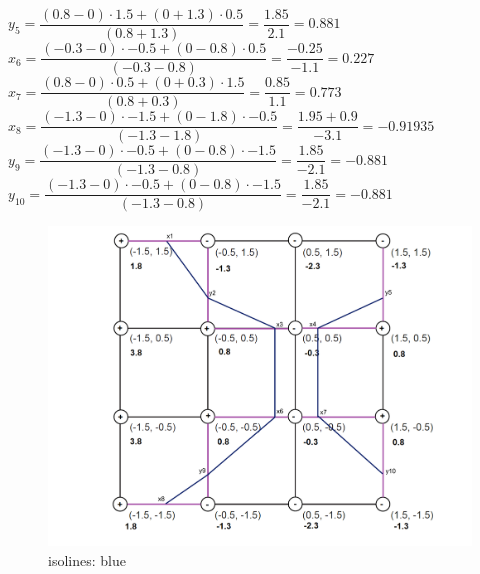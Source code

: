 \documentclass[a4paper]{article}
\begin{document}
\begin{enumerate}
			$y_{5} = \dfrac{(0.8 - 0) \cdot 1.5 + (0 + 1.3) \cdot 0.5}{(0.8 + 1.3)} = \dfrac{1.85}{2.1} = 0.881$\\
			
			$x_{6} = \dfrac{(-0.3 - 0) \cdot -0.5 + (0 - 0.8) \cdot 0.5}{(-0.3 - 0.8)} = \dfrac{-0.25}{-1.1} = 0.227$\\
			
			$x_{7} = \dfrac{(0.8 - 0) \cdot 0.5 + (0 + 0.3) \cdot 1.5}{(0.8 + 0.3)} = \dfrac{0.85}{1.1} =  0.773 $\\ 
			
			$ x_{8} = \dfrac{(-1.3 - 0) \cdot -1.5 + (0 - 1.8) \cdot -0.5}{(-1.3 - 1.8)} = \dfrac{1.95 + 0.9}{-3.1} = -0.91935$\\ 
			
			$y_{9} = \dfrac{(-1.3 - 0) \cdot -0.5 + (0 - 0.8) \cdot -1.5}{(- 1.3 - 0.8)} = \dfrac{1.85}{- 2.1} = - 0.881$\\


			$y_{10} = \dfrac{(-1.3 - 0) \cdot -0.5 + (0 - 0.8) \cdot -1.5}{(- 1.3 - 0.8)} = \dfrac{1.85}{- 2.1} = - 0.881$\\	
			
					
			\begin{figure}[h!]
				\centering 
				\includegraphics[width=13cm]{7_2_2_2.pdf}
				\caption{isolines: blue}
				\label{}
			\end{figure}
			
\end{enumerate}
\end{document}

